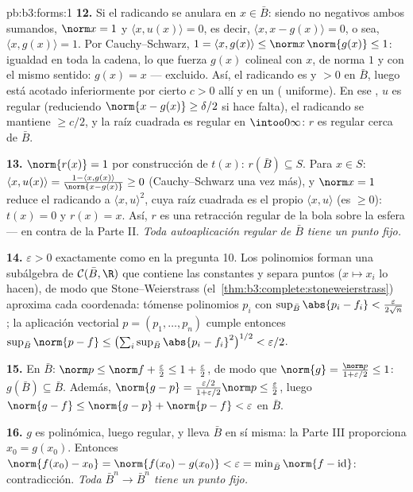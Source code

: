 \begin{solution}{pb:b3:forms:1}
\textbf{12.} Si el radicando se anulara en $x \in \bar B$: siendo no
negativos ambos sumandos, $\norm x = 1$ y $\langle x, u(x)\rangle = 0$,
es decir, $\langle x, x -
g(x)\rangle = 0$, o sea, $\langle x, g(x)\rangle = 1$. Por
Cauchy--Schwarz, $1 = \langle x, g(x)\rangle \leq
\norm x\,\norm{g(x)} \leq 1$: igualdad en toda la cadena, lo que fuerza
$g(x)$ colineal con $x$, de norma $1$ y con el mismo sentido: $g(x) = x$
--- excluido. Así, el radicando es
 y $> 0$ en $\bar B$, luego
está acotado inferiormente por cierto $c > 0$ allí y en un
( uniforme). En ese
, $u$ es regular (reduciendo
$\norm{x - g(x)} \geq
\delta/2$ si hace falta), el radicando se mantiene $\geq
c/2$, y la raíz cuadrada es regular en $\intoo0\infty$: $r$ es regular
cerca de $\bar B$.

\textbf{13.} $\norm{r(x)} = 1$ por construcción de $t(x)$:
$r(\bar B) \subseteq S$. Para $x \in S$: $\langle x,
u(x)\rangle = \frac{1 - \langle x, g(x)\rangle}{\norm{x -
g(x)}} \geq 0$ (Cauchy--Schwarz una vez más), y $\norm x =
1$ reduce el radicando a $\langle x, u\rangle^2$, cuya raíz cuadrada es
el propio $\langle x, u\rangle$ (es $\geq
0$): $t(x) = 0$ y $r(x) = x$. Así, $r$ es una retracción regular de la
bola sobre la esfera --- en contra de la Parte II. \emph{Toda
autoaplicación regular de $\bar B$ tiene un punto fijo.}

\textbf{14.} $\varepsilon > 0$ exactamente como en la pregunta 10. Los
polinomios forman una subálgebra de $\mathcal C(\bar B,
\R)$ que contiene las constantes y separa puntos ($x
\mapsto x_i$ lo hacen), de modo que Stone--Weierstrass
(el~\cref{thm:b3:complete:stoneweierstrass}) aproxima cada coordenada:
tómense polinomios $p_i$ con $\sup_{\bar
B}\abs{p_i - f_i} < \frac{\varepsilon}{2\sqrt n}$; la aplicación
vectorial $p = (p_1, \dots, p_n)$ cumple entonces
$\sup_{\bar B}\norm{p - f} \leq
\bigl(\sum_i\sup_{\bar B}\abs{p_i - f_i}^2\bigr)^{1/2} <
\varepsilon/2$.

\textbf{15.} En $\bar B$: $\norm p \leq \norm f +
\frac\varepsilon2 \leq 1 + \frac\varepsilon2$, de modo que
$\norm{g} = \frac{\norm p}{1 + \varepsilon/2} \leq 1$:
$g(\bar B) \subseteq \bar B$. Además, $\norm{g - p} =
\frac{\varepsilon/2}{1 + \varepsilon/2}\norm p \leq
\frac\varepsilon2$, luego $\norm{g - f} \leq \norm{g - p} +
\norm{p - f} < \varepsilon$ en $\bar B$.

\textbf{16.} $g$ es polinómica, luego regular, y lleva $\bar B$ en sí
misma: la Parte III proporciona $x_0 = g(x_0)$. Entonces
$\norm{f(x_0) - x_0} = \norm{f(x_0) - g(x_0)} <
\varepsilon = \min_{\bar B}\norm{f - \operatorname{id}}$: contradicción.
\emph{Toda 
$\bar B^n \to
\bar B^n$ tiene un punto fijo.}


\end{solution}

